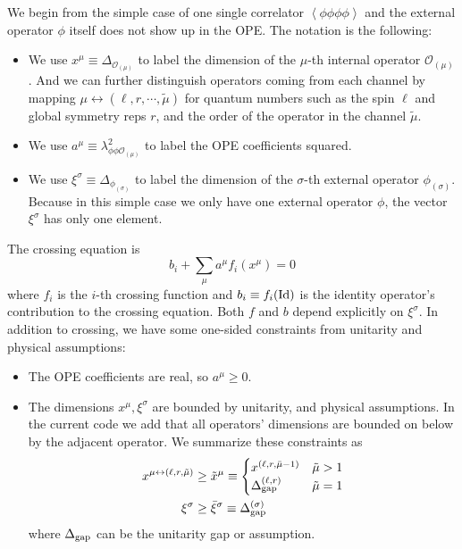 \documentclass[11pt]{article}
\newcommand{\CO}{\mathcal{O}}
\renewcommand{\(}{\left(}
\renewcommand{\)}{\right)}
\renewcommand{\[}{\left[}
\renewcommand{\]}{\right]}
\newcommand{\<}{\left\langle}
\renewcommand{\>}{\right\rangle}
\begin{document}
We begin from the simple case of one single correlator $\< \phi\phi\phi\phi \>$ and the external operator $\phi$ itself does not show up in the OPE. The notation is the following:
\begin{itemize}
\item We use $x^\mu \equiv \Delta_{\CO_{(\mu)}}$ to label the dimension of the $\mu$-th internal operator $\CO_{(\mu)}$. And we can further distinguish operators coming from each channel by mapping
$\mu \leftrightarrow (\ell,r,\cdots,\tilde  \mu)$ for quantum numbers such as the spin $\ell$ and global symmetry reps $r$, and the order of the operator in the channel $\tilde \mu$.
\item We use $a^\mu \equiv \lambda^2_{\phi\phi\CO_{(\mu)}}$ to label the OPE coefficients squared.
\item We use $\xi^\sigma \equiv \Delta_{\phi_{(\sigma)}}$ to label the dimension of the $\sigma$-th external operator $\phi_{(\sigma)}$. Because in this simple case we only have one external operator $\phi$, the vector $\xi^\sigma$ has only one element.
\end{itemize}
The crossing equation is 
\begin{equation}
b_i + \sum_\mu a^\mu f_i ( x^\mu ) = 0
\end{equation}
where $f_i$ is the $i$-th crossing function and $b_i \equiv f_i({\rm Id})$ is the identity operator's contribution to the crossing equation. Both $f$ and $b$ depend explicitly on $\xi^\sigma$. In addition to crossing, we have some one-sided constraints from unitarity and physical assumptions:
\begin{itemize}
\item The OPE coefficients are real, so $a^\mu \geq 0$.
\item The dimensions $x^\mu, \xi^\sigma$ are bounded by unitarity, and physical assumptions. In the current code we add that all operators' dimensions are bounded on below by the adjacent operator. We summarize these constraints as
\begin{equation}
\begin{aligned}
x^{\mu \leftrightarrow (\ell,r,\tilde \mu)} &\geq \tilde x^\mu \equiv  
\begin{cases}
x^{(\ell,r,\bar \mu-1)} & \tilde \mu > 1 \\
\Delta_{\rm gap}^{(\ell,r)} & \tilde \mu = 1
\end{cases}
\\
\xi^\sigma &\geq \bar \xi^\sigma \equiv \Delta_{\rm gap}^{(\sigma)}
\end{aligned}
\end{equation}
where $\Delta_{\rm gap}$ can be the unitarity gap or assumption.
\end{itemize}
\end{document}
